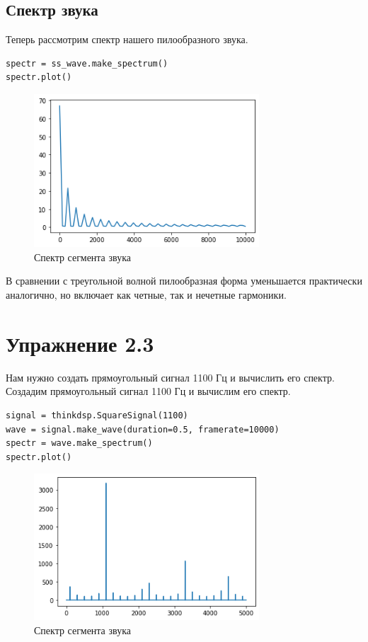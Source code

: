 \documentclass[a4paper,12pt]{report}
\begin{document}
\section{Спектр звука}

Теперь рассмотрим спектр нашего пилообразного звука.

\begin{lstlisting}[caption=Спектр звука]
spectr = ss_wave.make_spectrum()
spectr.plot()
\end{lstlisting}

\begin{figure}[H]
        \centering
        \includegraphics[width=0.75\textwidth]{2.png}
        \caption{Спектр сегмента звука}
        \label{fig:fig2_2}
\end{figure}

В сравнении с треугольной волной пилообразная форма уменьшается практически аналогично, но включает как четные, так и нечетные гармоники.


\chapter{Упражнение 2.3}

Нам нужно создать прямоугольный сигнал 1100 Гц и вычислить его спектр.
Создадим прямоугольный сигнал 1100 Гц и вычислим его спектр.

\begin{lstlisting}[caption=Создание прямоугольного сигнала]
signal = thinkdsp.SquareSignal(1100)
wave = signal.make_wave(duration=0.5, framerate=10000)
spectr = wave.make_spectrum()
spectr.plot()
\end{lstlisting}

\begin{figure}[H]
        \centering
        \includegraphics[width=0.75\textwidth]{3.png}
        \caption{Спектр сегмента звука}
        \label{fig:fig3_1}
\end{figure}
\end{document}
